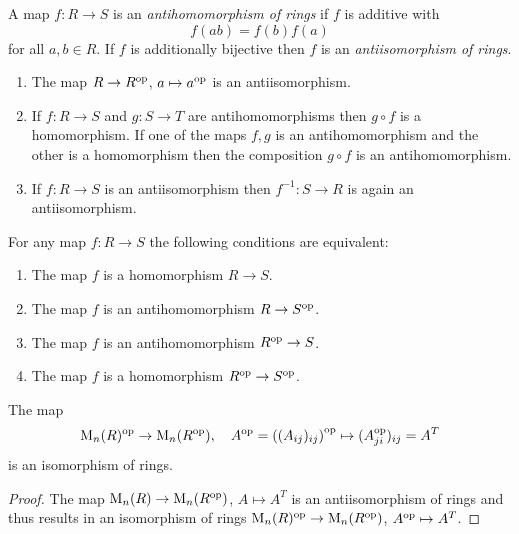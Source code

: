 \begin{definition}
  A map $f \colon R \to S$ is an \emph{antihomomorphism of rings} if $f$ is additive with
  \[
    f(a b) = f(b) f(a)
  \]
  for all $a, b \in R$.
  If $f$ is additionally bijective then $f$ is an \emph{antiisomorphism of rings}.
\end{definition}


\begin{example}
  \leavevmode
  \begin{enumerate}
     \item
      The map $R \to R^{\operatorname{op}}$, $a \mapsto a^{\operatorname{op}}$ is an antiisomorphism.
     \item
      If $f \colon R \to S$ and $g \colon S \to T$ are antihomomorphisms then $g \circ f$ is a homomorphism.
      If one of the maps $f, g$ is an antihomomorphism and the other is a homomorphism then the composition $g \circ f$ is an antihomomorphism.
    \item
      If $f \colon R \to S$ is an antiisomorphism then $f^{-1} \colon S \to R$ is again an antiisomorphism.
  \end{enumerate}
\end{example}


\begin{lemma}
  For any map $f \colon R \to S$ the following conditions are equivalent:
  \begin{enumerate}
    \item
      The map $f$ is a homomorphism $R \to S$.
    \item
      The map $f$ is an antihomomorphism $R \to S^{\operatorname{op}}$.
    \item
      The map $f$ is an antihomomorphism $R^{\operatorname{op}} \to S$.
    \item
      The map $f$ is a homomorphism $R^{\operatorname{op}} \to S^{\operatorname{op}}$.
  \end{enumerate}
\end{lemma}


\begin{lemma}
  \label{lemma: op of matrix rings}
  The map
  \[
            \operatorname{M}_n(R)^{\operatorname{op}}
    \to     \operatorname{M}_n(R^{\operatorname{op}}),
    \quad   A^{\operatorname{op}}
    =       \left( (A_{ij})_{ij} \right)^{{\operatorname{op}}}
    \mapsto (A_{ji}^{\operatorname{op}})_{ij}
    =       A^T
  \]
  is an isomorphism of rings.
\end{lemma}


\begin{proof}
  The map $\operatorname{M}_n(R) \to \operatorname{M}_n(R^{\operatorname{op}})$, $A \mapsto A^T$ is an antiisomorphism of rings and thus results in an isomorphism of rings $\operatorname{M}_n(R)^{\operatorname{op}} \to \operatorname{M}_n(R^{\operatorname{op}})$, $A^{\operatorname{op}} \mapsto A^T$.
\end{proof}


